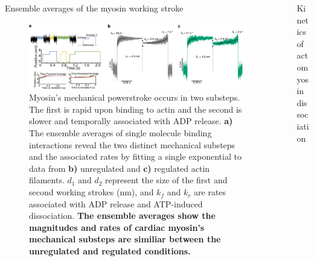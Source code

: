 \documentclass[final]{beamer}
\newlength{\sepwidth}
\newlength{\colwidth}
\newcommand{\separatorcolumn}{\begin{column}{\sepwidth}\end{column}}
\begin{document}
\begin{frame}[t]
\begin{columns}[t]
\begin{column}{\colwidth}
  \begin{block}{Ensemble averages of the myosin working stroke}
      \begin{figure}
        \includegraphics[scale=1.4]{ea-draw}
        \caption{Myosin's mechanical powerstroke occurs in two substeps. The first is rapid upon binding to actin and the second is slower and temporally associated with ADP release. \textbf{a)} The ensemble averages of single molecule binding interactions reveal the two distinct mechanical substeps and the associated rates by fitting a single exponential to data from \textbf{b)} unregulated and \textbf{c)} regulated actin filaments. $d_{1}$ and $d_{2}$ represent the size of the first and second working strokes (nm), and $k_{f}$ and $k_{r}$ are rates associated with ADP release and ATP-induced dissociation. \textbf{The ensemble averages show the magnitudes and rates of cardiac myosin's mechanical substeps are similiar between the unregulated and regulated conditions.}}
        \end{figure}
  \end{block}%


\end{column}

\separatorcolumn

\begin{column}{\colwidth}
  \begin{block}{Kinetics of actomyosin dissociation}


\end{block}
\end{column}
\end{columns}
\end{frame}
\end{document}
